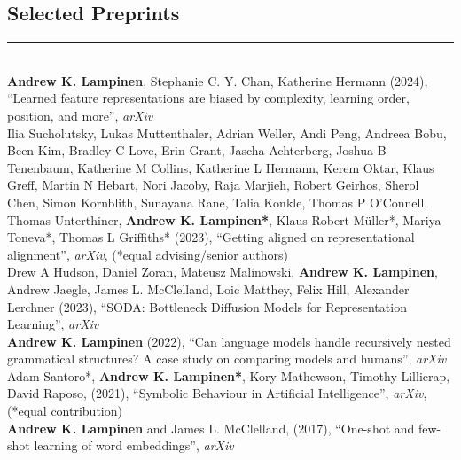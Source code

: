 \documentclass[margin]{res}
\begin{document}
\begin{resume}
{\vspace{1pt}\section{Selected\phantom{blah} Preprints} \vspace{-15pt} \rule{\textwidth}{0.5pt} \\[3pt]
\textbf{Andrew K. Lampinen}, Stephanie C. Y. Chan, Katherine Hermann (2024), {``Learned feature representations are biased by complexity, learning order, position, and more'',} \textit{arXiv} \\[3pt]
Ilia Sucholutsky, Lukas Muttenthaler, Adrian Weller, Andi Peng, Andreea Bobu, Been Kim, Bradley C Love, Erin Grant, Jascha Achterberg, Joshua B Tenenbaum, Katherine M Collins, Katherine L Hermann, Kerem Oktar, Klaus Greff, Martin N Hebart, Nori Jacoby, Raja Marjieh, Robert Geirhos, Sherol Chen, Simon Kornblith, Sunayana Rane, Talia Konkle, Thomas P O'Connell, Thomas Unterthiner, \textbf{Andrew K. Lampinen*}, Klaus-Robert Müller*, Mariya Toneva*, Thomas L Griffiths* (2023), {``Getting aligned on representational alignment'',} \textit{arXiv}, (*equal advising/senior authors) \\[3pt]
Drew A Hudson, Daniel Zoran, Mateusz Malinowski, \textbf{Andrew K. Lampinen}, Andrew Jaegle, James L. McClelland, Loic Matthey, Felix Hill, Alexander Lerchner (2023), {``SODA: Bottleneck Diffusion Models for Representation Learning''}, \textit{arXiv} \\[3pt]
\textbf{Andrew K. Lampinen} (2022), {``Can language models handle recursively nested grammatical structures? A case study on comparing models and humans'',} \textit{arXiv} \\[3pt]
Adam Santoro*, \textbf{Andrew K. Lampinen*}, Kory Mathewson, Timothy Lillicrap, David Raposo, (2021), {``Symbolic Behaviour in Artificial Intelligence'',} \textit{arXiv}, (*equal contribution) \\[3pt] 
\textbf{Andrew K. Lampinen} and James L. McClelland, (2017), {``One-shot and few-shot learning of word embeddings'',} \textit{arXiv} 

}
\end{resume}
\end{document}

